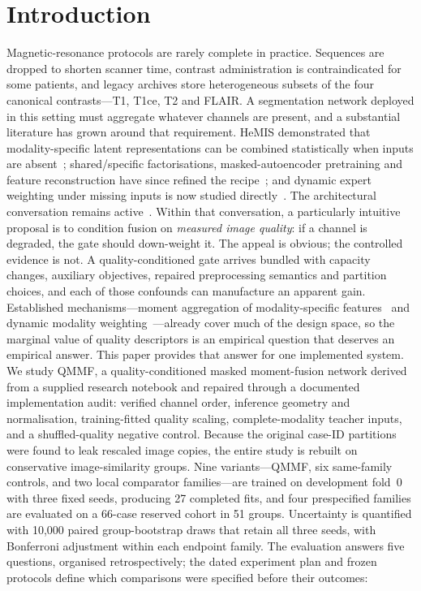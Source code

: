 \section{Introduction}
\label{sec:intro} Magnetic-resonance protocols are rarely complete in practice. Sequences are dropped to shorten scanner time, contrast administration is contraindicated for some patients, and legacy archives store heterogeneous subsets of the four canonical contrasts---T1, T1ce, T2 and FLAIR. A segmentation network deployed in this setting must aggregate whatever channels are present, and a substantial literature has grown around that requirement. HeMIS demonstrated that modality-specific latent representations can be combined statistically when inputs are absent~\cite{havaei2016hemis}; shared/specific factorisations, masked-autoencoder pretraining and feature reconstruction have since refined the recipe~\cite{wang2023shaspec,liu2023m3ae,zeng2024missing}; and dynamic expert weighting under missing inputs is now studied directly~\cite{li2025simmlm}. The architectural conversation remains active~\cite{li2025dcseg,pipoli2025imfuse,ali2026d3seg}. Within that conversation, a particularly intuitive proposal is to condition fusion on \emph{measured image quality}: if a channel is degraded, the gate should down-weight it. The appeal is obvious; the controlled evidence is not. A quality-conditioned gate arrives bundled with capacity changes, auxiliary objectives, repaired preprocessing semantics and partition choices, and each of those confounds can manufacture an apparent gain. Established mechanisms---moment aggregation of modality-specific features~\cite{havaei2016hemis} and dynamic modality weighting~\cite{li2025simmlm}---already cover much of the design space, so the marginal value of quality descriptors is an empirical question that deserves an empirical answer. This paper provides that answer for one implemented system. We study QMMF, a quality-conditioned masked moment-fusion network derived from a supplied research notebook and repaired through a documented implementation audit: verified channel order, inference geometry and normalisation, training-fitted quality scaling, complete-modality teacher inputs, and a shuffled-quality negative control. Because the original case-ID partitions were found to leak rescaled image copies, the entire study is rebuilt on conservative image-similarity groups. Nine variants---QMMF, six same-family controls, and two local comparator families---are trained on development fold~0 with three fixed seeds, producing 27 completed fits, and four prespecified families are evaluated on a 66-case reserved cohort in 51 groups. Uncertainty is quantified with 10{,}000 paired group-bootstrap draws that retain all three seeds, with Bonferroni adjustment within each endpoint family. The evaluation answers five questions, organised retrospectively; the dated experiment plan and frozen protocols define which comparisons were specified before their outcomes:
